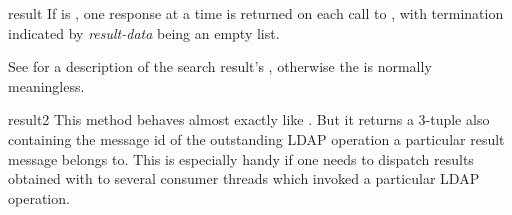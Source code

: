 \begin{methoddesc}[LDAPObject]{result}{}
If  is , one response at a time is returned on
each call to , with termination indicated by 
\textit{result-data} being an empty list.

See  for a description of the search result's 
, otherwise the  is normally meaningless.

\end{methoddesc}

\begin{methoddesc}[LDAPObject]{result2}{} %
This method behaves almost exactly like . But
it returns a 3-tuple also containing the message id of the
outstanding LDAP operation a particular result message belongs
to. This is especially handy if one needs to dispatch results
obtained with  to several consumer
threads which invoked a particular LDAP operation.
\end{methoddesc}


